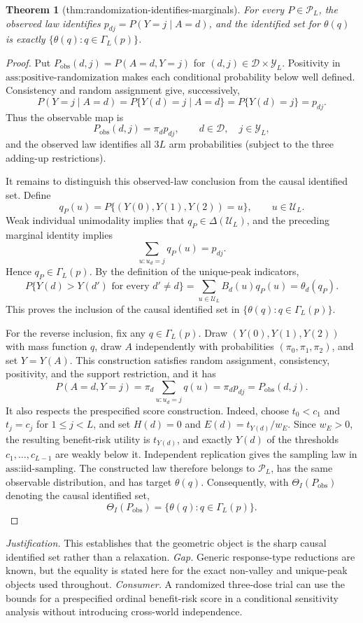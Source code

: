 \documentclass{article}
\newtheorem{theorem}{Theorem}
\begin{document}
\begin{theorem}[thm:randomization-identifies-marginals]\label{thm:randomization-identifies-marginals}
For every \(P\in\mathcal P_L\), the observed law identifies \(p_{dj}=P(Y=j\mid A=d)\), and the identified set for \(\theta(q)\) is exactly \(\{\theta(q):q\in\Gamma_L(p)\}\).
\end{theorem}
\begin{proof}
Put \(P_{\mathrm{obs}}(d,j)=P(A=d,Y=j)\) for \((d,j)\in\mathcal D\times\mathcal Y_L\).  Positivity in \(\text{ass:positive-randomization}\) makes each conditional probability below well defined.  Consistency and random assignment give, successively,
\[
 P(Y=j\mid A=d)
 =P\{Y(d)=j\mid A=d\}
 =P\{Y(d)=j\}
 =p_{dj}.
\]
Thus the observable map is
\[
 P_{\mathrm{obs}}(d,j)=\pi_d p_{dj},
 \qquad d\in\mathcal D,\quad j\in\mathcal Y_L,
\]
and the observed law identifies all \(3L\) arm probabilities (subject to the three adding-up restrictions).

It remains to distinguish this observed-law conclusion from the causal identified set.  Define
\[
 q_P(u)=P\{(Y(0),Y(1),Y(2))=u\},\qquad u\in\mathcal U_L.
\]
Weak individual unimodality implies that \(q_P\in\Delta(\mathcal U_L)\), and the preceding marginal identity implies
\[
 \sum_{u:u_d=j}q_P(u)=p_{dj}.
\]
Hence \(q_P\in\Gamma_L(p)\).  By the definition of the unique-peak indicators,
\[
 P\{Y(d)>Y(d')\text{ for every }d'\ne d\}
 =\sum_{u\in\mathcal U_L}B_d(u)q_P(u)=\theta_d(q_P).
\]
This proves the inclusion of the causal identified set in \(\{\theta(q):q\in\Gamma_L(p)\}\).

For the reverse inclusion, fix any \(q\in\Gamma_L(p)\).  Draw \((Y(0),Y(1),Y(2))\) with mass function \(q\), draw \(A\) independently with probabilities \((\pi_0,\pi_1,\pi_2)\), and set \(Y=Y(A)\).  This construction satisfies random assignment, consistency, positivity, and the support restriction, and it has
\[
 P(A=d,Y=j)=\pi_d\sum_{u:u_d=j}q(u)=\pi_dp_{dj}=P_{\mathrm{obs}}(d,j).
\]
It also respects the prespecified score construction.  Indeed, choose \(t_0<c_1\) and \(t_j=c_j\) for \(1\le j<L\), and set \(H(d)=0\) and \(E(d)=t_{Y(d)}/w_E\).  Since \(w_E>0\), the resulting benefit-risk utility is \(t_{Y(d)}\), and exactly \(Y(d)\) of the thresholds \(c_1,\ldots,c_{L-1}\) are weakly below it.  Independent replication gives the sampling law in \(\text{ass:iid-sampling}\).  The constructed law therefore belongs to \(\mathcal P_L\), has the same observable distribution, and has target \(\theta(q)\).  Consequently, with \(\Theta_I(P_{\mathrm{obs}})\) denoting the causal identified set,
\[
 \Theta_I(P_{\mathrm{obs}})=\{\theta(q):q\in\Gamma_L(p)\}.
\]
\end{proof}
\par\smallskip\noindent \textit{Justification.} This establishes that the geometric object is the sharp causal identified set rather than a relaxation. \textit{Gap.} Generic response-type reductions are known, but the equality is stated here for the exact non-valley and unique-peak objects used throughout. \textit{Consumer.} A randomized three-dose trial can use the bounds for a prespecified ordinal benefit-risk score in a conditional sensitivity analysis without introducing cross-world independence.
\end{document}

